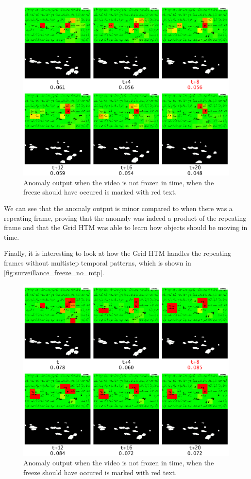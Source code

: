\begin{figure}[H]
    \centering
    \includegraphics[width=\textwidth]{resources/experiments/surveillance/surveillance_freeze_no_freeze.png}
    \caption{Anomaly output when the video is not frozen in time, when the freeze should have occured is marked with red text.}
\end{figure}
We can see that the anomaly output is minor compared to when there was a repeating frame, proving that the anomaly was indeed a product of the repeating frame and that the Grid HTM was able to learn how objects should be moving in time.
\par
Finally, it is interesting to look at how the Grid HTM handles the repeating frames without multistep temporal patterns, which is shown in \autoref{fig:surveillance_freeze_no_mtp}.
\begin{figure}[H]
    \centering
    \includegraphics[width=\textwidth]{resources/experiments/surveillance/surveillance_freeze_no_mtp.png}
    \caption{Anomaly output when the video is not frozen in time, when the freeze should have occured is marked with red text.}
    \label{fig:surveillance_freeze_no_mtp}
\end{figure}
